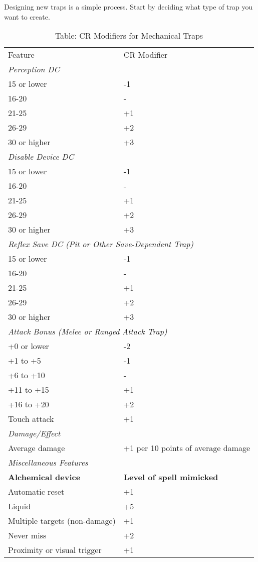 				
Designing new traps is a simple process. Start by deciding what type of trap you want to create.
\begin{table}[]
\sffamily
\caption{Table: CR Modifiers for Mechanical Traps}
\begin{tabular}{ll}
Feature & CR Modifier\\
\multicolumn{2}{l}{\textit{Perception DC}}\\
15 or lower & -1\\
16-20 & -\\
21-25 & +1\\
26-29 & +2\\
30 or higher & +3\\
\multicolumn{2}{l}{\textit{Disable Device DC}}\\
15 or lower & -1\\
16-20 & -\\
21-25 & +1\\
26-29 & +2\\
30 or higher & +3\\
\multicolumn{2}{l}{\textit{Reflex Save DC (Pit or Other Save-Dependent Trap)}}\\
15 or lower & -1\\
16-20 & -\\
21-25 & +1\\
26-29 & +2\\
30 or higher & +3\\
\multicolumn{2}{l}{\textit{Attack Bonus (Melee or Ranged Attack Trap)}}\\
+0 or lower & -2\\
+1 to +5 & -1\\
+6 to +10 & -\\
+11 to +15 & +1\\
+16 to +20 & +2\\
Touch attack & +1\\
\multicolumn{2}{l}{\textit{Damage/Effect}}\\
Average damage & +1 per 10 points of average damage\\
\multicolumn{2}{l}{\textit{Miscellaneous Features}}\\
\textbf{Alchemical device} & \textbf{Level of spell mimicked}\\
Automatic reset & +1\\
Liquid & +5\\
Multiple targets (non-damage) & +1\\
Never miss & +2\\
Proximity or visual trigger & +1\\

\end{tabular}
\end{table}
